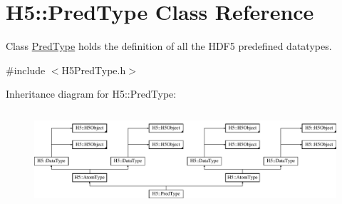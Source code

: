 \hypertarget{class_h5_1_1_pred_type}{}\section{H5\+:\+:Pred\+Type Class Reference}
\label{class_h5_1_1_pred_type}


Class \hyperlink{class_h5_1_1_pred_type}{Pred\+Type} holds the definition of all the H\+D\+F5 predefined datatypes.  




{\ttfamily \#include $<$H5\+Pred\+Type.\+h$>$}

Inheritance diagram for H5\+:\+:Pred\+Type\+:\begin{figure}[H]
\begin{center}
\leavevmode
\includegraphics[height=3.571428cm]{class_h5_1_1_pred_type}
\end{center}
\end{figure}
